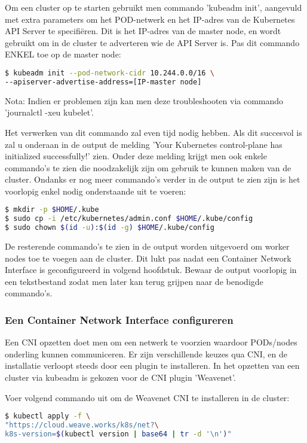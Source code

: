 Om een cluster op te starten gebruikt men commando 'kubeadm init', aangevuld met extra parameters om het POD-netwerk en het IP-adres van de Kubernetes API Server te specifiëren. Dit is het IP-adres van de master node, en wordt gebruikt om in de cluster te adverteren wie de API Server is. Pas dit commando ENKEL toe op de master node: 
\begin{lstlisting}[language=bash]
$ kubeadm init --pod-network-cidr 10.244.0.0/16 \
--apiserver-advertise-address=[IP-master node]

\end{lstlisting}

Nota: Indien er problemen zijn kan men deze troubleshooten via commando 'journalctl -xeu kubelet'. 

Het verwerken van dit commando zal even tijd nodig hebben. Als dit succesvol is zal u onderaan in de output de melding 'Your Kubernetes control-plane has initialized successfully!' zien. Onder deze melding krijgt men ook enkele commando's te zien die noodzakelijk zijn om gebruik te kunnen maken van de cluster. Ondanks er nog meer commando's verder in de output te zien zijn is het voorlopig enkel nodig onderstaande uit te voeren:
\begin{lstlisting}[language=bash]
$ mkdir -p $HOME/.kube
$ sudo cp -i /etc/kubernetes/admin.conf $HOME/.kube/config
$ sudo chown $(id -u):$(id -g) $HOME/.kube/config

\end{lstlisting}

De resterende commando's te zien in de output worden uitgevoerd om worker nodes toe te voegen aan de cluster. Dit lukt pas nadat een Container Network Interface is geconfigureerd in volgend hoofdstuk. Bewaar de output voorlopig in een tekstbestand zodat men later kan terug grijpen naar de benodigde commando's.

\subsubsection{Een Container Network Interface configureren}

Een CNI opzetten doet men om een netwerk te voorzien waardoor PODs/nodes onderling kunnen communiceren. Er zijn verschillende keuzes qua CNI, en de installatie verloopt steeds door een plugin te installeren. In het opzetten van een cluster via kubeadm is gekozen voor de CNI plugin 'Weavenet'. \autocite{Weaveworks2022}

Voer volgend commando uit om de Weavenet CNI te installeren in de cluster: 
\begin{lstlisting}[language=bash]
$ kubectl apply -f \
"https://cloud.weave.works/k8s/net?\
k8s-version=$(kubectl version | base64 | tr -d '\n')"
\end{lstlisting}

